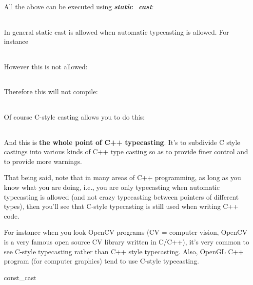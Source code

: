 \documentclass[
]{article}
\begin{document}
\begin{longtable}[]{@{}@{}}
\toprule
\endhead
\bottomrule
\end{longtable}

All the above can be executed using \emph{\textbf{static\_cast}}:

\begin{longtable}[]{@{}@{}}
\toprule
\endhead
\bottomrule
\end{longtable}

In general static cast is allowed when automatic typecasting is allowed.
For instance

\begin{longtable}[]{@{}@{}}
\toprule
\endhead
\bottomrule
\end{longtable}

However this is not allowed:

\begin{longtable}[]{@{}@{}}
\toprule
\endhead
\bottomrule
\end{longtable}

Therefore this will not compile:

\begin{longtable}[]{@{}@{}}
\toprule
\endhead
\bottomrule
\end{longtable}

Of course C-style casting allows you to do this:

\begin{longtable}[]{@{}@{}}
\toprule
\endhead
\bottomrule
\end{longtable}

And this is \textbf{the whole point of C++ typecasting}. It's to
subdivide C style castings into various kinds of C++ type casting so as
to provide finer control and to provide more warnings.

That being said, note that in many areas of C++ programming, as long as
you know what you are doing, i.e., you are only typecasting when
automatic typecasting is allowed (and not crazy typecasting between
pointers of different types), then you'll see that C-style typecasting
is still used when writing C++ code.

For instance when you look OpenCV programs (CV = computer vision, OpenCV
is a very famous open source CV library written in C/C++), it's very
common to see C-style typecasting rather than C++ style typecasting.
Also, OpenGL C++ program (for computer graphics) tend to use C-style
typecasting.

const\_cast
\end{document}
